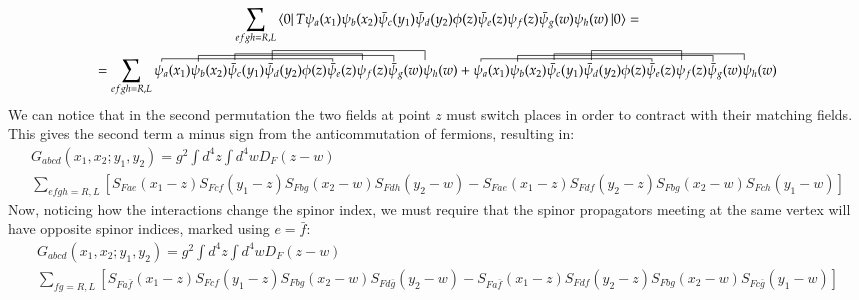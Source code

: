 \documentclass{article}
\begin{document}
\begin{equation}
\begin{gathered}
    \sum_{efgh=R,L}
    \bra{0}T
        \psi_a(x_1)
        \psi_b(x_2)
        \bar{\psi}_c(y_1)
        \bar{\psi}_d(y_2)
        \phi(z)
        \bar{\psi}_e(z)
        \psi_f(z)
        \bar{\psi}_g(w)
        \psi_h(w)
    \ket{0} = \\ =
    \sum_{efgh=R,L}
        \contraction[0.5ex]{}{\psi_a}{(x_1)\psi_b(x_2)\bar{\psi}_c(y_1)\bar{\psi}_d(y_2)\phi(z)}{\bar{\psi}}
        \contraction{\psi_a(x_1)}{\psi_b}{(x_2)\bar{\psi}_c(y_1)\bar{\psi}_d(y_2)\phi(z)\bar{\psi}_e(z)\psi_f(z)}{\bar{\psi}}
        \contraction{\psi_a(x_1)\psi_b(x_2)}{\bar{\psi}_c}{(y_1)\bar{\psi}_d(y_2)\phi(z)\bar{\psi}_e(z)}{\psi}
        \contraction[1.5ex]{\psi_a(x_1)\psi_b(x_2)\bar{\psi}_c(y_1)}{\bar{\psi}_d}{(y_2)\phi(z)\bar{\psi}_e(z)\psi_f(z)\bar{\psi}_g(z)}{\psi}
        \psi_a(x_1)
        \psi_b(x_2)
        \bar{\psi}_c(y_1)
        \bar{\psi}_d(y_2)
        \phi(z)
        \bar{\psi}_e(z)
        \psi_f(z)
        \bar{\psi}_g(w)
        \psi_h(w) +
        \contraction[0.5ex]{}{\psi_a}{(x_1)\psi_b(x_2)\bar{\psi}_c(y_1)\bar{\psi}_d(y_2)\phi(z)}{\bar{\psi}}
        \contraction{\psi_a(x_1)}{\psi_b}{(x_2)\bar{\psi}_c(y_1)\bar{\psi}_d(y_2)\phi(z)\bar{\psi}_e(z)\psi_f(z)}{\bar{\psi}}
        \contraction{\psi_a(x_1)\psi_b(x_2)}{\bar{\psi}_c}{(y_1)\bar{\psi}_d(y_2)\phi(z)\bar{\psi}_e(z)\psi_f(z)\bar{\psi}_g(z)}{\psi}
        \contraction[1.5ex]{\psi_a(x_1)\psi_b(x_2)\bar{\psi}_c(y_1)}{\bar{\psi}_d}{(y_2)\phi(z)\bar{\psi}_e(z)}{\psi}
        \psi_a(x_1)
        \psi_b(x_2)
        \bar{\psi}_c(y_1)
        \bar{\psi}_d(y_2)
        \phi(z)
        \bar{\psi}_e(z)
        \psi_f(z)
        \bar{\psi}_g(w)
        \psi_h(w)
\end{gathered}
\end{equation}
We can notice that in the second permutation the two fields at point $z$ must switch places in order to contract with their matching fields. This gives the second term a minus sign from the anticommutation of fermions, resulting in:
\begin{equation}
\begin{gathered}
    G_{abcd}(x_1, x_2; y_1, y_2) = g^2 \int d^4z \int d^4 w D_F(z - w) \\ \sum_{efgh=R,L}\left[S_{Fae}(x_1 - z)S_{Fcf}(y_1 - z)S_{Fbg}(x_2 - w)S_{Fdh}(y_2 - w) - S_{Fae}(x_1 - z)S_{Fdf}(y_2 - z)S_{Fbg}(x_2 - w)S_{Fch}(y_1 - w)\right]
\end{gathered}
\end{equation}
Now, noticing how the interactions change the spinor index, we must require that the spinor propagators meeting at the same vertex will have opposite spinor indices, marked using $e = \bar{f}$:
\begin{equation}
\begin{gathered}
    G_{abcd}(x_1, x_2; y_1, y_2) = g^2 \int d^4z \int d^4 w D_F(z - w) \\ \sum_{fg=R,L}\left[S_{Fa\bar{f}}(x_1 - z)S_{Fcf}(y_1 - z)S_{Fbg}(x_2 - w)S_{Fd\bar{g}}(y_2 - w) - S_{Fa\bar{f}}(x_1 - z)S_{Fdf}(y_2 - z)S_{Fbg}(x_2 - w)S_{Fc\bar{g}}(y_1 - w)\right]
\end{gathered}
\end{equation}
\end{document}

